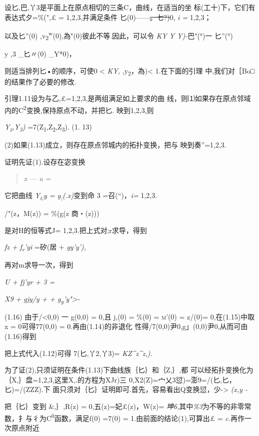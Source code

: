 \documentclass{article}
\begin{document}
设匕,巴,丫3是平面上在原点相切的三条C，曲线，在适当的坐
标(工十)下，它们有表达式夕=\%(",£ = 1,2,3,并满足条件
匕(0)------\sout{。{七?})}0, \emph{i =} 1,2,3；

以及匕''(0)
,v\textsubscript{2}\textsuperscript{w}(0),為"(0)彼此不等.因此，可以令
\emph{KY Y Y)-}{巴"(°)一 匕''(°)}

y ,3 \_匕〃(0) \_Y*0)，

则适当排列匕•的顺序，可使0 \textless{} \emph{KY,}
,y\textsubscript{2}，為)\textless{} 1.在下面的引理
中,我们对［Bo□的结果作了必要的修改.

引理1.11设为与乙,£=1,2,3,是两组满足如上要求的曲
线，则⑴如果存在原点邻域内的C\textsuperscript{2}变换,保持原点不动，并把匕.
映到1,2,3,则

\emph{\textsc{Y\textsubscript{z},Y\textsubscript{3})}}
=7(Z\textsubscript{1},Z\textsubscript{2},Z\textsubscript{3}). (1. 13)

(2)如果(1.13)成立，则存在原点邻城内的拓扑变换，把与 映到奏''=1,2,3.

证明先证(1).设存在宓变换

\begin{quote}
z --- \emph{u =}
\end{quote}

它把曲线 \emph{Y\textsubscript{i;}y = y\textsubscript{;}(.x)}变到命 3
=召(``)，\emph{i=} 1,2,3.

/"(z，M(z)) = \%(g(z 商・(z)))

是对H的恒等式J= 1,2,3.把上式对;r求导，得到

\emph{fz + f\textsubscript{r}'yi} =矽(居 + \emph{gy'y'),}

再对m求导一次，得到

\emph{U + fj'yr + 3 =}

\emph{X9 + gjy/y + + g\textsubscript{y}'y"\textgreater{}-}

(1.16) 由于/\textless{}0,0) 一 g(0,0) = 0,且 j,(0) = \%(0) =
\textsc{m'(0)} = z/(0)= 0,在(1.15)中取x = 0可得77(0,0) =
0.再由(1.14)的非退化 性得/7(0,0)尹0,g」(0,0)尹0,从而可由(1.16)得到

把上式代入(1.12)可得 7(匕,丫2,丫3)= \emph{KZ\^{}z\^{}z,).}

为了证(2),只须证明在条件(1.13)下曲线族｛匕｝和｛Z,｝,都
可以经拓扑变换化为｛X,｝盘=1,2,3,这里X,.的方程为XJr)三
0,X2(Z)=宀乂3愆)=澎9=/(匕,匕，匕)=/(Z\textbar{}ZZ).下
面只须对｛匕｝证明即可.首先，容易看出Q变换愆，少-\textgreater{}
\emph{(x,y -}

把｛匕｝变到 \&,｝,R(z) = 0,五(z)=妃£(z)，W(z)=
\emph{坤6,}其中\emph{\%3}为不等的非零常数，扌与彳为C\textsuperscript{0}函数，满足f(0)
=7(0) = 1.由前面的结论(1),可算出£ = \emph{c.}再作一次原点附近
\end{document}
